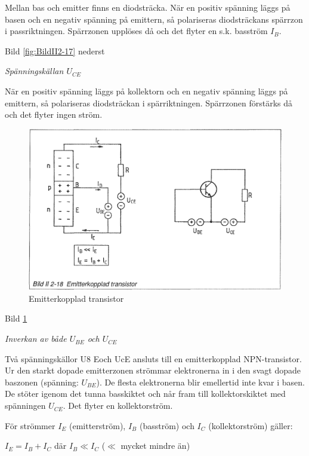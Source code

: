 Mellan bas och emitter finns en diodsträcka. När en positiv spänning läggs på
basen och en negativ spänning på emittern, så polariseras diodsträckans spärrzon
i passriktningen. Spärrzonen upplöses då och det flyter en s.k. basström
\(I_B\).

Bild \ref{fig:BildII2-17} nederst

\emph{Spänningskällan \(U_{CE}\)}

När en positiv spänning läggs på kollektorn och en negativ spänning läggs på
emittern, så polariseras diodsträckan i spärriktningen. Spärrzonen förstärks då
och det flyter ingen ström.

\begin{figure}[h]
\begin{center}
\includegraphics[width=14cm]{images/bild_2_2-18}
\caption{Emitterkopplad transistor}
\label{fig:BildII2-18}
\end{center}
\end{figure}

Bild \ref{fig:BildII2-18}

\emph{Inverkan av både \(U_{BE}\) och \(U_{CE}\)}

Två spänningskällor U8 Eoch UcE ansluts till en emitterkopplad NPN-transistor.
Ur den starkt dopade emitterzonen strömmar elektronerna in i den svagt dopade
baszonen (spänning: \(U_{BE}\)). De flesta elektronerna blir emellertid inte
kvar i basen. De stöter igenom det tunna basskiktet och når fram till
kollektorskiktet med spänningen \(U_{CE}\). Det flyter en kollektorström.

För strömmer \(I_E\) (emitterström), \(I_B\) (basström) och \(I_C\)
(kollektorström) gäller:

\(I_E = I_B + I_C\) där \(I_B \ll I_C\) (\(\ll\) mycket mindre än)

